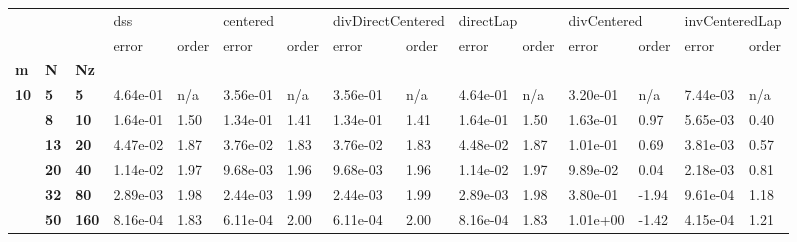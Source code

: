 \begin{tabular}{lllllllllllllll}
\toprule
   &    &     & \multicolumn{2}{l}{dss} & \multicolumn{2}{l}{centered} & \multicolumn{2}{l}{divDirectCentered} & \multicolumn{2}{l}{directLap} & \multicolumn{2}{l}{divCentered} & \multicolumn{2}{l}{invCenteredLap} \\
   &    &     &     error & order &     error & order &             error & order &     error & order &       error &  order &          error & order \\
\textbf{m} & \textbf{N} & \textbf{Nz} &           &       &           &       &                   &       &           &       &             &        &                &       \\
\midrule
\textbf{10} & \textbf{5 } & \textbf{5  } &  4.64e-01 &   n/a &  3.56e-01 &   n/a &          3.56e-01 &   n/a &  4.64e-01 &   n/a &    3.20e-01 &    n/a &       7.44e-03 &   n/a \\
   & \textbf{8 } & \textbf{10 } &  1.64e-01 &  1.50 &  1.34e-01 &  1.41 &          1.34e-01 &  1.41 &  1.64e-01 &  1.50 &    1.63e-01 &   0.97 &       5.65e-03 &  0.40 \\
   & \textbf{13} & \textbf{20 } &  4.47e-02 &  1.87 &  3.76e-02 &  1.83 &          3.76e-02 &  1.83 &  4.48e-02 &  1.87 &    1.01e-01 &   0.69 &       3.81e-03 &  0.57 \\
   & \textbf{20} & \textbf{40 } &  1.14e-02 &  1.97 &  9.68e-03 &  1.96 &          9.68e-03 &  1.96 &  1.14e-02 &  1.97 &    9.89e-02 &   0.04 &       2.18e-03 &  0.81 \\
   & \textbf{32} & \textbf{80 } &  2.89e-03 &  1.98 &  2.44e-03 &  1.99 &          2.44e-03 &  1.99 &  2.89e-03 &  1.98 &    3.80e-01 &  -1.94 &       9.61e-04 &  1.18 \\
   & \textbf{50} & \textbf{160} &  8.16e-04 &  1.83 &  6.11e-04 &  2.00 &          6.11e-04 &  2.00 &  8.16e-04 &  1.83 &    1.01e+00 &  -1.42 &       4.15e-04 &  1.21 \\
\bottomrule
\end{tabular}
